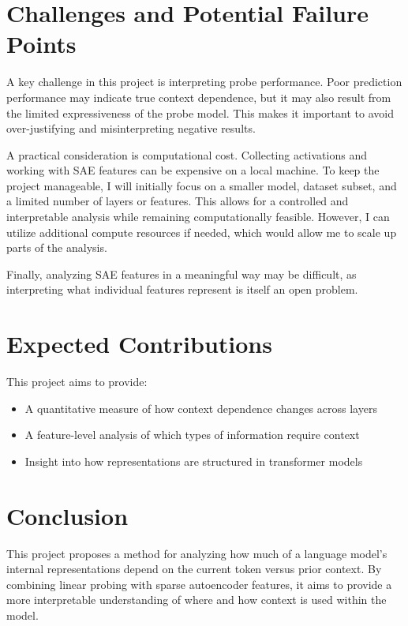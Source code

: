 \documentclass[12pt]{article}
\begin{document}
\section{Challenges and Potential Failure Points}

A key challenge in this project is interpreting probe performance. Poor prediction performance may indicate true context dependence, but it may also result from the limited expressiveness of the probe model. This makes it important to avoid over-justifying and misinterpreting negative results.

A practical consideration is computational cost. Collecting activations and working with SAE features can be expensive on a local machine. To keep the project manageable, I will initially focus on a smaller model, dataset subset, and a limited number of layers or features. This allows for a controlled and interpretable analysis while remaining computationally feasible. However, I can utilize additional compute resources if needed, which would allow me to scale up parts of the analysis.

Finally, analyzing SAE features in a meaningful way may be difficult, as interpreting what individual features represent is itself an open problem.

\section{Expected Contributions}

This project aims to provide:
\begin{itemize}
    \item A quantitative measure of how context dependence changes across layers
    \item A feature-level analysis of which types of information require context
    \item Insight into how representations are structured in transformer models
\end{itemize}

\section{Conclusion}

This project proposes a method for analyzing how much of a language model's internal representations depend on the current token versus prior context. By combining linear probing with sparse autoencoder features, it aims to provide a more interpretable understanding of where and how context is used within the model.

\printbibliography
\end{document}
